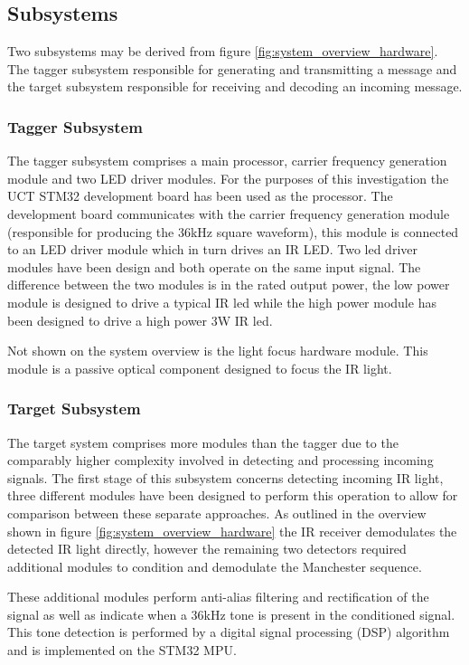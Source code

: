 \subsection{Subsystems}

Two subsystems may be derived from figure \ref{fig:system_overview_hardware}. The tagger subsystem responsible for generating and transmitting a message and the target subsystem responsible for receiving and decoding an incoming message.

\subsubsection{Tagger Subsystem}
The tagger subsystem comprises a main processor, carrier frequency generation module and two LED driver modules. For the purposes of this investigation the UCT STM32\footnotemark{} development board has been used as the processor. The development board communicates with the carrier frequency generation module (responsible for producing the 36kHz square waveform), this module is connected to an LED driver module which in turn drives an IR LED. Two led driver modules have been design and both operate on the same input signal. The difference between the two modules is in the rated output power, the low power module is designed to drive a typical IR led while the high power module has been designed to drive a high power 3W IR led.

Not shown on the system overview is the light focus hardware module. This module is a passive optical component designed to focus the IR light.


\subsubsection{Target Subsystem}
The target system comprises more modules than the tagger due to the comparably higher complexity involved in detecting and processing incoming signals. The first stage of this subsystem concerns detecting incoming IR light, three different modules have been designed to perform this operation to allow for comparison between these separate approaches. As outlined in the overview shown in figure \ref{fig:system_overview_hardware} the IR receiver demodulates the detected IR light directly, however the remaining two detectors required additional modules to condition and demodulate the Manchester sequence.

These additional modules perform anti-alias filtering and rectification of the signal as well as indicate when a 36kHz tone is present in the conditioned signal. This tone detection is performed by a digital signal processing (DSP) algorithm and is implemented on the STM32 MPU.

